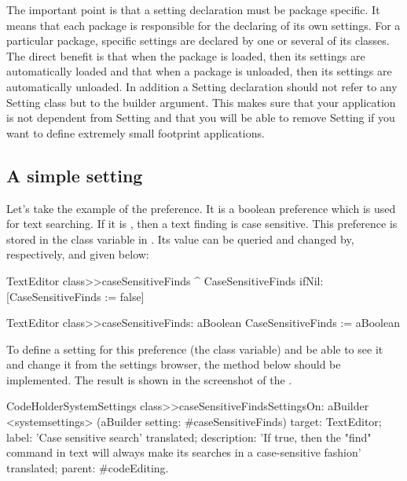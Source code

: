 \documentclass[a4paper,10pt,twoside]{book}
\begin{document}
The important point is that a setting declaration must be package specific. It means that each package is responsible for the declaring of its own settings. For a particular package, specific settings are declared by one or several of its classes. The direct benefit is that when the package is loaded, then its settings are automatically loaded and that when a package is unloaded, then its settings are automatically unloaded. In addition a Setting declaration should not refer to any Setting class but to the builder argument. This makes sure that your application is not dependent from Setting and that you will be able to remove Setting if you want to 
define extremely small footprint applications. 

\subsection{A simple setting}
Let's take the example of the  preference. It is a boolean preference which is used for text searching. If it is , then a text finding is case sensitive. This preference is stored in the  class variable in . Its value can be queried and changed by, respectively,  and  given below:
\begin{code}{}
TextEditor class>>caseSensitiveFinds
	^ CaseSensitiveFinds ifNil: [CaseSensitiveFinds := false]

TextEditor class>>caseSensitiveFinds: aBoolean
	CaseSensitiveFinds := aBoolean
\end{code}

To define a setting for this preference (the  class variable) and be able to see it and change it from the settings browser, the method below should be implemented. The result is shown in the screenshot of the . 

\begin{code}{}
CodeHolderSystemSettings class>>caseSensitiveFindsSettingsOn: aBuilder
	<systemsettings>
	(aBuilder setting: #caseSensitiveFinds) 
		target: TextEditor;
		label: 'Case sensitive search' translated;
		description: 'If true, then the "find" command in text will always make its searches in a case-sensitive fashion' translated;
		parent: #codeEditing.
\end{code}
\end{document}
